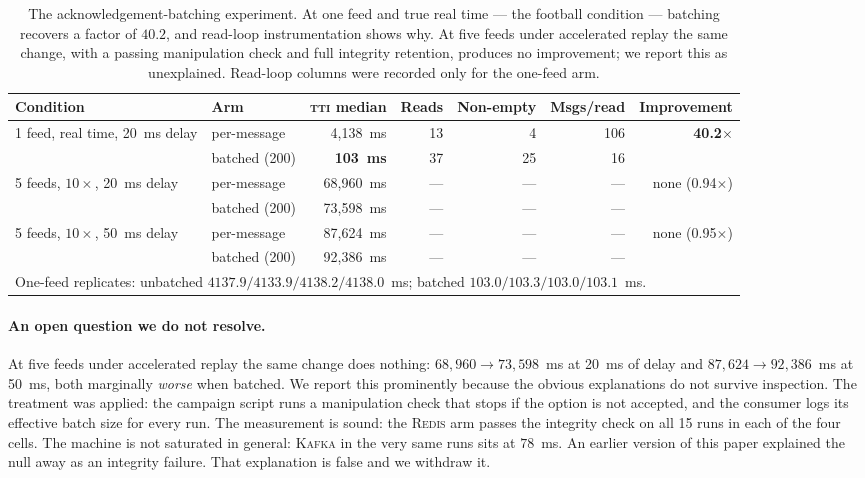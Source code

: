 \documentclass[Afour,sageh,times]{sagej}
\newcommand{\redis}{\textsc{Redis}}
\newcommand{\kafka}{\textsc{Kafka}}
\newcommand{\tti}{\textsc{tti}}
\begin{document}
\begin{table}[htbp]
\centering
\caption{The acknowledgement-batching experiment. At one feed and true real time --- the football
condition --- batching recovers a factor of $40.2$, and read-loop instrumentation shows why. At
five feeds under accelerated replay the same change, with a passing manipulation check and full
integrity retention, produces no improvement; we report this as unexplained. Read-loop columns
were recorded only for the one-feed arm.}
\label{tab:ack}
\begin{tabular}{llrrrrr}
\toprule
Condition & Arm & \tti{} median & Reads & Non-empty & Msgs/read & Improvement \\
\midrule
\multirow{2}{*}{1 feed, real time, 20~ms delay}
 & per-message & 4{,}138~ms & 13 & 4  & 106 & \multirow{2}{*}{\textbf{40.2$\times$}} \\
 & batched (200) & \textbf{103~ms} & 37 & 25 & 16 & \\
\midrule
\multirow{2}{*}{5 feeds, $10\times$, 20~ms delay}
 & per-message & 68{,}960~ms & --- & --- & --- & \multirow{2}{*}{none (0.94$\times$)} \\
 & batched (200) & 73{,}598~ms & --- & --- & --- & \\
\midrule
\multirow{2}{*}{5 feeds, $10\times$, 50~ms delay}
 & per-message & 87{,}624~ms & --- & --- & --- & \multirow{2}{*}{none (0.95$\times$)} \\
 & batched (200) & 92{,}386~ms & --- & --- & --- & \\
\midrule
\multicolumn{7}{l}{\footnotesize One-feed replicates: unbatched $4137.9/4133.9/4138.2/4138.0$~ms;
batched $103.0/103.3/103.0/103.1$~ms.} \\
\bottomrule
\end{tabular}
\end{table}

\paragraph{An open question we do not resolve.} At five feeds under accelerated replay the same
change does nothing: $68{,}960 \rightarrow 73{,}598$~ms at 20~ms of delay and
$87{,}624 \rightarrow 92{,}386$~ms at 50~ms, both marginally \emph{worse} when batched. We report
this prominently because the obvious explanations do not survive inspection. The treatment was
applied: the campaign script runs a manipulation check that stops if the option is not accepted,
and the consumer logs its effective batch size for every run. The measurement is sound: the
\redis{} arm passes the integrity check on all 15 runs in each of the four cells. The machine is
not saturated in general: \kafka{} in the very same runs sits at $78$~ms. An earlier version of
this paper explained the null away as an integrity failure. That explanation is false and we
withdraw it.
\end{document}

